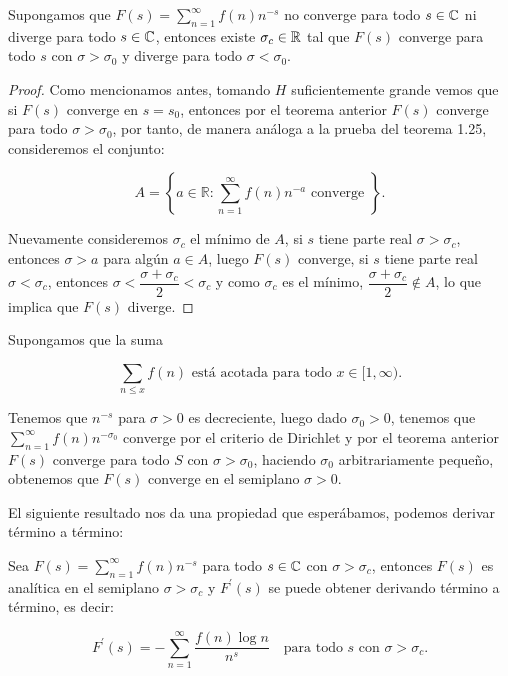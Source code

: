 \begin{theorem}
Supongamos que $F(s)=\displaystyle\sum_{n=1}^{\infty} f(n)n^{-s}$ no converge para todo $s\in \mathbb{C}$ ni diverge para todo $s\in\mathbb{C}$, entonces existe $\sigma_c\in \mathbb{R}$ tal que $F(s)$ converge para todo $s$ con $\sigma>\sigma_0$ y diverge para todo $\sigma<\sigma_0$.
\end{theorem}


\begin{proof}
Como mencionamos antes, tomando $H$ suficientemente grande vemos que si $F(s)$ converge en $s=s_0$, entonces por el teorema anterior $F(s)$ converge para todo $\sigma>\sigma_0$, por tanto, de manera análoga a la prueba del teorema 1.25, consideremos el conjunto:

$$A=\left\{a \in \mathbb{R} : \sum_{n=1}^{\infty} f(n) n^{-a} \text { converge }\right\}.$$

Nuevamente  consideremos $\sigma_c$ el mínimo de $A$, si $s$ tiene parte real $\sigma>\sigma_c$, entonces $\sigma>a$ para algún $a\in A$, luego $F(s)$ converge, si $s$ tiene parte real $\sigma<\sigma_c$, entonces $\sigma<\dfrac{\sigma+\sigma_c}{2}<\sigma_c$ y como $\sigma_c$ es el mínimo, $\dfrac{\sigma+\sigma_c}{2}\not\in A$, lo que implica que $F(s)$ diverge.
\end{proof}

\begin{eg}
Supongamos que la suma

$$\sum_{n\leq x}f(n) \text{ está acotada para  todo }x\in [1,\infty).$$

Tenemos que $n^{-s}$ para $\sigma>0$ es decreciente, luego dado $\sigma_0>0$, tenemos que $\displaystyle\sum_{n=1}^{\infty}f(n)n^{-\sigma_0}$ converge por el criterio de Dirichlet y por el teorema anterior $F(s)$ converge para todo $S$ con $\sigma>\sigma_0$, haciendo $\sigma_0$ arbitrariamente pequeño, obtenemos que $F(s)$  converge en el semiplano $\sigma>0$.
\end{eg}

El siguiente resultado nos da una propiedad que esperábamos, podemos derivar término a término:

\begin{corollary}
Sea $F(s)=\displaystyle\sum_{n=1}^{\infty} f(n)n^{-s}$ para todo $s\in \mathbb{C}$ con $\sigma>\sigma_c$, entonces $F(s)$ es analítica en el semiplano $\sigma>\sigma_c$ y $F^{\prime}(s)$ se puede obtener derivando término a término, es decir:

$$F^{\prime}(s)=-\sum_{n=1}^{\infty}\frac{f(n)\log n}{n^s} \quad \text{para todo } s \text{ con } \sigma>\sigma_c.$$
\end{corollary}


